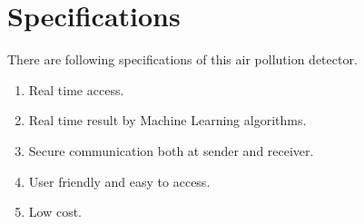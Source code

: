 \section{Specifications}

There are following specifications of this air pollution detector.

\begin{enumerate}
	\item {Real time access.}
	\item {Real time result by Machine Learning algorithms.}
	\item {Secure communication both at sender and receiver.}
	\item {User friendly and easy to access.}
	\item {Low cost.}
\end{enumerate}
